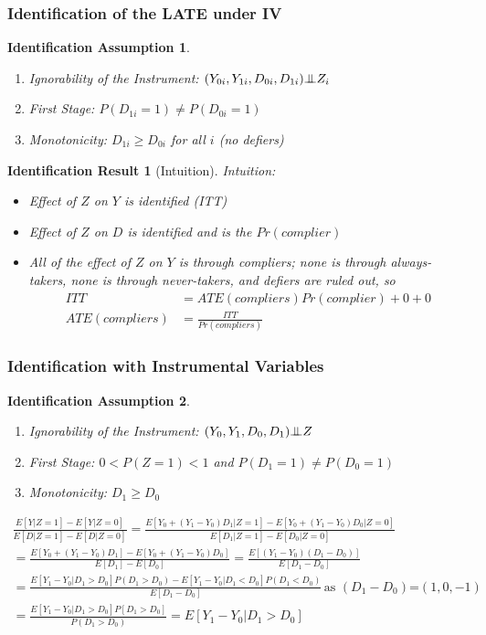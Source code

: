 \documentclass[xcolor=dvipsnames]{beamer}
\newtheorem{iass}{Identification Assumption}
\newtheorem{ires}{Identification Result}
\newcommand{\indep}{{\bot\negthickspace\negthickspace\bot}}
\begin{document}
\begin{frame}
  \frametitle{Identification of the LATE under IV}
\begin{iass}
\small
\begin{enumerate}
  \item Ignorability of the Instrument: $(Y_{0i},Y_{1i}, D_{0i},D_{1i}) \indep Z_i$
  \item First Stage:  $P(D_{1i}=1) \neq P(D_{0i}=1)$
  \item Monotonicity: $D_{1i} \geq D_{0i}$ for all $i$ (no defiers)
  \end{enumerate}
\end{iass}\vspace{-.2in}
\bigskip
{}
\begin{ires}[Intuition]
\footnotesize
Intuition:
\begin{itemize}
\item<3-> Effect of $Z$ on $Y$ is identified (ITT)
\item<4-> Effect of $Z$ on $D$ is identified and is the $Pr(complier)$
\item<5-> All of the effect of $Z$ on $Y$ is through compliers; none is through always-takers, none is through never-takers, and defiers are ruled out, so
\vspace{-.1in}
\begin{align*}
ITT &= ATE(compliers)Pr(complier) + 0 + 0 \\
ATE(compliers) &= \frac{ITT}{Pr(compliers)}
\end{align*}
\end{itemize}
\end{ires}
\end{frame}


\begin{frame}
  \frametitle{Identification with Instrumental Variables}
\begin{iass}
\small
\begin{enumerate}
  \item Ignorability of the Instrument: $(Y_{0},Y_{1}, D_{0},D_{1}) \indep Z$
  \item First Stage: $0 < P(Z=1) < 1$ and
  $P(D_{1}=1) \neq P(D_{0}=1)$
  \item Monotonicity: $D_{1} \geq D_{0}$
  \end{enumerate}
\end{iass}\vspace{-.2in}
\scriptsize
\begin{Proof}
\begin{multline*}
\frac{E[Y|Z=1]-E[Y|Z=0]}{E[D|Z=1]-E[D|Z=0]}= \frac{E[Y_0 + (Y_1-Y_0) D_1|Z=1]-E[Y_0 + (Y_1-Y_0) D_0|Z=0]}{E[D_1|Z=1]-E[D_0|Z=0]}\\
= \frac{E[Y_0 + (Y_1-Y_0) D_1] - E[Y_0 + (Y_1-Y_0) D_0]}{E[D_1]-E[D_0]}=\frac{E[(Y_1-Y_0)(D_1-D_0)]}{E[D_1-D_0]} \\
= \frac{E[Y_1-Y_0|D_1>D_0]P(D_1>D_0)-E[Y_1-Y_0|D_1<D_0]P(D_1<D_0)}{E[D_1-D_0]} \,\mbox{as $(D_1-D_0)$=$(1,0,-1)$}\\
= \frac{E[Y_1-Y_0|D_1>D_0]P[D_1>D_0]}{P(D_1>D_0)}=E[Y_1-Y_0|D_1>D_0]
\end{multline*}
\end{Proof}
\end{frame}
\end{document}

